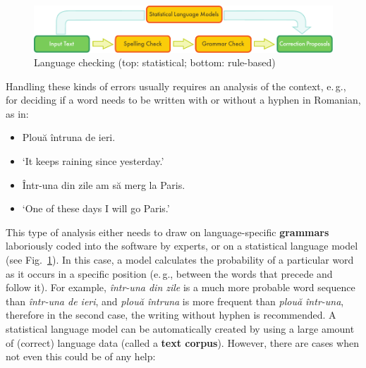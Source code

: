\begin{multicols}{2}
\begin{figure}[htb]
\center
\includegraphics[width=\textwidth]{../_media/english/language_checking}
\caption{Language checking (top: statistical; bottom: rule-based)}
\label{fig:langcheckingaarch_en}
\vspace{-15mm}
\end{figure}

Handling these kinds of errors usually requires an analysis of the context, e.\,g., for deciding if a word needs to be written with or without a hyphen in Romanian, as in:

\begin{example}
\begin{itemize}
\item[] Plouă întruna de ieri.
\item[] `It keeps raining since yesterday.'
\end{itemize}
\end{example}

\begin{example}
\begin{itemize}
\item[] Într-una din zile am să merg la Paris.
\item[] `One of these days I will go Paris.'
\end{itemize}
\end{example}

This type of analysis either needs to draw on language-specific \textbf{grammars} laboriously coded into the software by experts, or on a  statistical language model (see Fig.~\ref{fig:langcheckingaarch_en}). In this case, a model calculates the probability of a particular word as it occurs in a specific position (e.\,g., between the words that precede and follow it). For example, \textit{într-una din zile} is a much more probable word sequence than \textit{într-una de ieri}, and \textit{plouă întruna} is more frequent than \textit{plouă într-una}, therefore in the second case, the writing without hyphen is recommended. A statistical language model can be automatically created by using a large amount of (correct) language data (called a \textbf{text corpus}). However, there are cases when not even this could be of any help:


\end{multicols}
